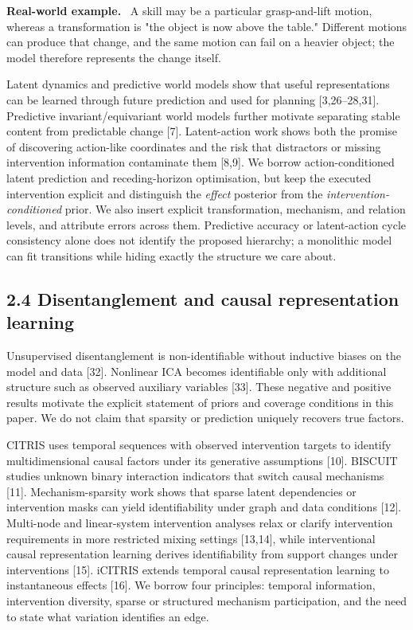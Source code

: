 \documentclass[11pt]{article}
\newenvironment{example}{%
  \par\smallskip\noindent\begin{minipage}{\textwidth}%
  \color{teal!60!black}\small
  \textbf{\color{teal!70!black}Real-world example.}\
}{%
  \end{minipage}\par\smallskip}
\begin{document}
\begin{example}
A skill may be a particular grasp-and-lift motion, whereas a transformation is "the object is now above the table." Different motions
can produce that change, and the same motion can fail on a heavier object; the model therefore represents the change itself.
\end{example}

Latent dynamics and predictive world models show that useful representations can be learned through future prediction and used for
planning [3,26--28,31]. Predictive invariant/equivariant world models further motivate separating stable content from predictable
change [7]. Latent-action work shows both the promise of discovering action-like coordinates and the risk that distractors or
missing intervention information contaminate them [8,9]. We borrow action-conditioned latent prediction and receding-horizon
optimisation, but keep the executed intervention explicit and distinguish the \emph{effect} posterior from the
\emph{intervention-conditioned} prior. We also insert explicit transformation, mechanism, and relation levels, and attribute errors
across them. Predictive accuracy or latent-action cycle consistency alone does not identify the proposed hierarchy; a monolithic
model can fit transitions while hiding exactly the structure we care about.

\subsection*{2.4 Disentanglement and causal representation learning}

Unsupervised disentanglement is non-identifiable without inductive biases on the model and data [32]. Nonlinear ICA becomes
identifiable only with additional structure such as observed auxiliary variables [33]. These negative and positive results motivate
the explicit statement of priors and coverage conditions in this paper. We do not claim that sparsity or prediction uniquely
recovers true factors.

CITRIS uses temporal sequences with observed intervention targets to identify multidimensional causal factors under its generative
assumptions [10]. BISCUIT studies unknown binary interaction indicators that switch causal mechanisms [11]. Mechanism-sparsity work
shows that sparse latent dependencies or intervention masks can yield identifiability under graph and data conditions [12].
Multi-node and linear-system intervention analyses relax or clarify intervention requirements in more restricted mixing settings
[13,14], while interventional causal representation learning derives identifiability from support changes under interventions [15].
iCITRIS extends temporal causal representation learning to instantaneous effects [16]. We borrow four principles: temporal
information, intervention diversity, sparse or structured mechanism participation, and the need to state what variation identifies
an edge.
\end{document}
